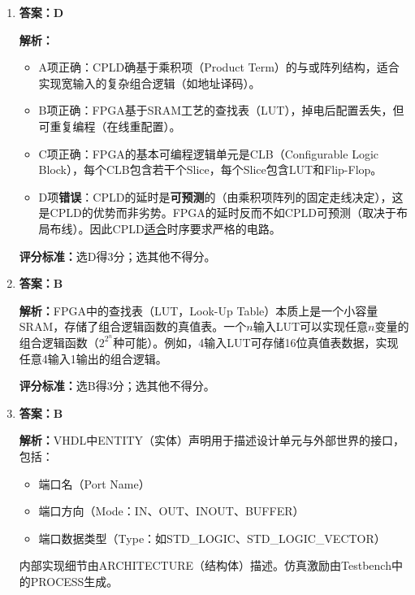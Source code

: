 \begin{enumerate}[label=\arabic*., leftmargin=*]

\item \textbf{答案：D}

\noindent\textbf{解析：}
\begin{itemize}
  \item A项正确：CPLD确基于乘积项（Product Term）的与或阵列结构，适合实现宽输入的复杂组合逻辑（如地址译码）。
  \item B项正确：FPGA基于SRAM工艺的查找表（LUT），掉电后配置丢失，但可重复编程（在线重配置）。
  \item C项正确：FPGA的基本可编程逻辑单元是CLB（Configurable Logic Block），每个CLB包含若干个Slice，每个Slice包含LUT和Flip-Flop。
  \item D项\textbf{错误}：CPLD的延时是\textbf{可预测}的（由乘积项阵列的固定走线决定），这是CPLD的优势而非劣势。FPGA的延时反而不如CPLD可预测（取决于布局布线）。因此CPLD\underline{适合}时序要求严格的电路。
\end{itemize}

\medskip
\noindent\textbf{评分标准：}选D得3分；选其他不得分。


\item \textbf{答案：B}

\noindent\textbf{解析：}FPGA中的查找表（LUT，Look-Up Table）本质上是一个小容量SRAM，存储了组合逻辑函数的真值表。一个$n$输入LUT可以实现任意$n$变量的组合逻辑函数（$2^{2^n}$种可能）。例如，4输入LUT可存储16位真值表数据，实现任意4输入1输出的组合逻辑。

\noindent\textbf{评分标准：}选B得3分；选其他不得分。


\item \textbf{答案：B}

\noindent\textbf{解析：}VHDL中ENTITY（实体）声明用于描述设计单元与外部世界的接口，包括：
\begin{itemize}
  \item 端口名（Port Name）
  \item 端口方向（Mode：IN、OUT、INOUT、BUFFER）
  \item 端口数据类型（Type：如STD\_LOGIC、STD\_LOGIC\_VECTOR）
\end{itemize}
内部实现细节由ARCHITECTURE（结构体）描述。仿真激励由Testbench中的PROCESS生成。


\end{enumerate}

